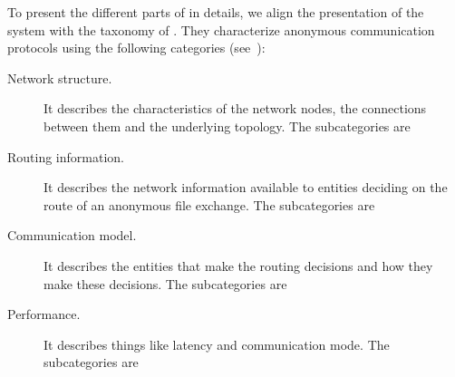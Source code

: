 To present the different parts of \name in details, 
we align the presentation of the system with the taxonomy of 
\textcite{RoutingSurveyAnonymousProtocols}.
They characterize anonymous communication protocols using the following 
categories (see~\cite[Table 1]{RoutingSurveyAnonymousProtocols}):
\begin{description}
  \item[Network structure.]
    It describes the characteristics of the network nodes, the connections between 
    them and the underlying topology.
    The subcategories are

  \item[Routing information.]
    It describes the network information available to entities deciding on 
    the route of an anonymous file exchange.
    The subcategories are

  \item[Communication model.]
   It describes the entities that make the routing decisions and how they 
    make these decisions.
    The subcategories are

  \item[Performance.]
    It describes things like latency and communication mode.
    The subcategories are
\end{description}

